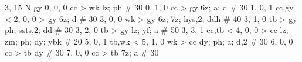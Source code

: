 %
3, 15 %
N %
gy
%
0, 0, 0
cc > wk
lz; ph # 30
%
0, 1, 0
cc > gy
6z; a; d # 30
%
1, 0, 1
cc,gy < 
%
2, 0, 0
 > gy
6z; d # 30
%
3, 0, 0
wk > gy
6z; 7z; hys,2; ddh # 40
%
3, 1, 0
tb > gy
ph; ssts,2; dd # 30
%
3, 2, 0
tb > gy
lz; yf; a # 50
%
3, 3, 1
cc,tb < 
%
4, 0, 0
 > cc
lz; zm; ph; dy; ybk # 20
%
5, 0, 1
tb,wk < 
%
5, 1, 0
wk > cc
dy; ph; a; d,2 # 30
%
6, 0, 0
cc > tb
dy # 30
%
7, 0, 0
cc > tb
7z; a # 30